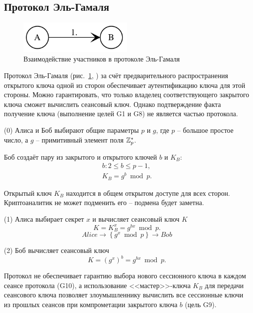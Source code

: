 \subsection{Протокол Эль-Гамаля}

\begin{figure}
    \centering
    \includegraphics[width=0.5\textwidth]{pic/key_distribution-el-gamal}
    \caption{Взаимодействие участников в протоколе Эль-Гамаля\label{fig:key_distribution-el-gamal}}
\end{figure}

Протокол Эль-Гамаля (рис.~\ref{fig:key_distribution-el-gamal}, \cite{ElGamal:1984, ElGamal:1985}) за счёт предварительного распространения открытого ключа одной из сторон обеспечивает аутентификацию ключа для этой стороны. Можно гарантировать, что только владелец соответствующего закрытого ключа сможет вычислить сеансовый ключ. Однако подтверждение факта получение ключа (выполнение целей G1 и G8) не является частью протокола.

\begin{protocol}
    \item[(0)] Алиса и Боб выбирают общие параметры $p$ и $g$, где $p$ -- большое простое число, а $g$ -- примитивный элемент поля $\mathbb{Z}_p^*$.
    \item[{}] Боб создаёт пару из закрытого и открытого ключей $b$ и $K_B$:
        \[\begin{array}{l}
            b: 2 \leq b \leq p - 1, \\
            K_B = g^b \bmod p.
        \end{array}\]
    \item[{}] Открытый ключ $K_B$ находится в общем открытом доступе для всех сторон. Криптоаналитик не может подменить его -- подмена будет заметна.
    \item[(1)] Алиса выбирает секрет $x$ и вычисляет сеансовый ключ $K$
        \[ K = K_B^{x} = g^{bx} \bmod p. \]
        \[ Alice \to \left\{ g^x \bmod p \right\} \to Bob\]
    \item[(2)] Боб вычисляет сеансовый ключ
        \[ K = (g^x)^{b} = g^{bx} \bmod p. \]
\end{protocol}

Протокол не обеспечивает гарантию выбора нового сессионного ключа в каждом сеансе протокола (G10), а использование <<мастер>>-ключа $K_B$ для передачи сеансового ключа позволяет злоумышленнику вычислить все сессионные ключи из прошлых сеансов при компрометации закрытого ключа $b$ (цель G9).

